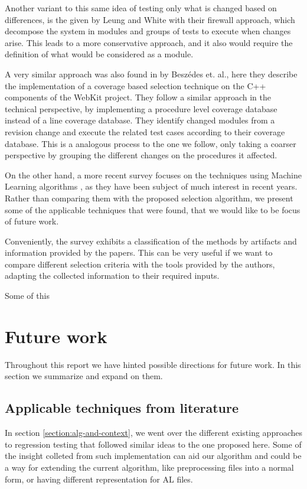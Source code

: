 \documentclass{article}
\begin{document}
Another variant to this same idea of testing only what is changed based on differences, is the given by Leung and White with their firewall approach, which decompose the system in modules and groups of tests to execute when changes arise. This leads to a more conservative approach, and it also would require the definition of what would be considered as a module.

A very similar approach was also found in \cite{6405252} by Beszédes et. al., here they describe the implementation of a coverage based selection technique on the C++ components of the WebKit project. They follow a similar approach in the technical perspective, by implementing a procedure level coverage database instead of a line coverage database. They identify changed modules from a revision change and execute the related test cases according to their coverage database. This is a analogous process to the one we follow, only taking a coarser perspective by grouping the different changes on the procedures it affected.

On the other hand, a more recent survey focuses on the techniques using Machine Learning algorithms \cite{Pan2021TestCS}, as they have been subject of much interest in recent years. Rather than comparing them with the proposed selection algorithm, we present some of the applicable techniques that were found, that we would like to be focus of future work.

Conveniently, the survey exhibits a classification of the methods by artifacts and information provided by the papers. This can be very useful if we want to compare different selection criteria with the tools provided by the authors, adapting the collected information to their required inputs.

Some of this

\section{Future work}\label{section:future-work}
Throughout this report we have hinted possible directions for future work. In this section we summarize and expand on them. 

\subsection{Applicable techniques from literature}
In section \ref{section:alg-and-context}, we went over the different existing approaches to regression testing that followed similar ideas to the one proposed here. Some of the insight colleted from such implementation can aid our algorithm and could be a way for extending the current algorithm, like preprocessing files into a normal form, or having different representation for AL files.
\end{document}
